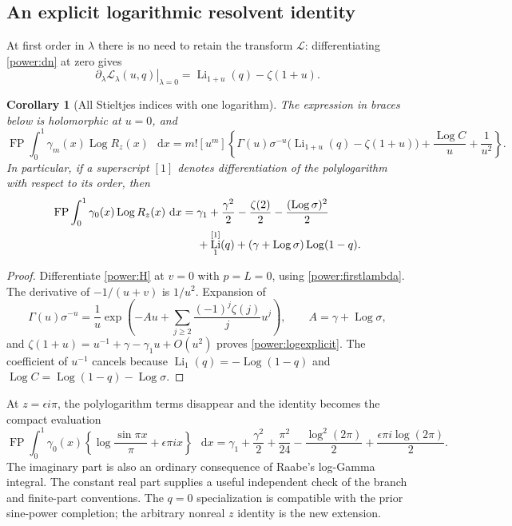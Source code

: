 \documentclass[11pt,a4paper]{article}
\numberwithin{equation}{section}
\newtheorem{corollary}[theorem]{Corollary}
\theoremstyle{definition}
\theoremstyle{remark}
\DeclareMathOperator{\Li}{Li}
\DeclareMathOperator{\Log}{Log}
\DeclareMathOperator{\FP}{FP}
\newcommand{\dd}{\mathop{}\!\mathrm{d}}
\begin{document}
\subsection{An explicit logarithmic resolvent identity}

At first order in $\lambda$ there is no need to retain the transform
$\mathcal L$: differentiating \eqref{power:dn} at zero gives
\begin{equation}\label{power:firstlambda}
 \left.\partial_\lambda\mathcal L_\lambda(u,q)\right|_{\lambda=0}
       =\Li_{1+u}(q)-\zeta(1+u).
\end{equation}

\begin{corollary}[All Stieltjes indices with one logarithm]
\label{power:logcor}
The expression in braces below is holomorphic at $u=0$, and
\begin{equation}\label{power:alllog}
 \boxed{\displaystyle
 \FP\int_0^1\gamma_m(x)\Log R_z(x)\,\dd x
 =m![u^m]\left\{
 \Gamma(u)\sigma^{-u}\bigl(\Li_{1+u}(q)-\zeta(1+u)\bigr)
       +\frac{\Log C}{u}+\frac1{u^2}\right\}.}
\end{equation}
In particular, if a superscript $[1]$ denotes differentiation of the
polylogarithm with respect to its order, then
\begin{align}\label{power:logexplicit}
 \FP\int_0^1\gamma_0(x)\Log R_z(x)\,\dd x
  ={}&\gamma_1+\frac{\gamma^2}{2}-\frac{\zeta(2)}2
              -\frac{(\Log\sigma)^2}{2}\notag\\
    &+\Li_1^{[1]}(q)
               +(\gamma+\Log\sigma)\Log(1-q).
\end{align}
\end{corollary}
\begin{proof}
Differentiate \eqref{power:H} at $v=0$ with $p=L=0$, using
\eqref{power:firstlambda}.  The derivative of $-1/(u+v)$ is
$1/u^2$.  Expansion of
\[
 \Gamma(u)\sigma^{-u}
 =\frac1u\exp\left(-Au+\sum_{j\ge2}\frac{(-1)^j\zeta(j)}j u^j\right),
 \qquad A=\gamma+\Log\sigma,
\]
and $\zeta(1+u)=u^{-1}+\gamma-\gamma_1u+O(u^2)$ proves
\eqref{power:logexplicit}.  The coefficient of $u^{-1}$ cancels
because $\Li_1(q)=-\Log(1-q)$ and
$\Log C=\Log(1-q)-\Log\sigma$.
\end{proof}

At $z=\epsilon i\pi$, the polylogarithm terms disappear and the
identity becomes the compact evaluation
\begin{equation}\label{power:logspecial}
 \FP\int_0^1\gamma_0(x)
       \left\{\log\frac{\sin\pi x}{\pi}+\epsilon\pi ix\right\}\,\dd x
 =\gamma_1+\frac{\gamma^2}{2}+\frac{\pi^2}{24}
       -\frac{\log^2(2\pi)}2+\frac{\epsilon\pi i\log(2\pi)}2.
\end{equation}
The imaginary part is also an ordinary consequence of Raabe's
log-Gamma integral.  The constant real part supplies a useful
independent check of the branch and finite-part conventions.
The $q=0$ specialization is compatible with the prior sine-power
completion; the arbitrary nonreal $z$ identity is the new extension.
\end{document}
